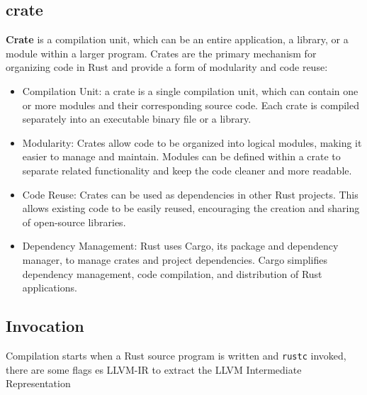 \documentclass{article}
\begin{document}
\subsection{crate}
\textbf{Crate} is a compilation unit, which can be an entire application, a library, or a module within a larger program. Crates are the primary mechanism for organizing code in Rust and provide a form of modularity and code reuse:
\begin{itemize}
    \item Compilation Unit: a crate is a single compilation unit, which can contain one or more modules and their corresponding source code. Each crate is compiled separately into an executable binary file or a library.
    \item Modularity: Crates allow code to be organized into logical modules, making it easier to manage and maintain. Modules can be defined within a crate to separate related functionality and keep the code cleaner and more readable.
    \item Code Reuse: Crates can be used as dependencies in other Rust projects. This allows existing code to be easily reused, encouraging the creation and sharing of open-source libraries.
    \item Dependency Management: Rust uses Cargo, its package and dependency manager, to manage crates and project dependencies. Cargo simplifies dependency management, code compilation, and distribution of Rust applications.
\end{itemize}

\subsection{Invocation}
Compilation starts when a Rust source program is written and \texttt{rustc} invoked, there are some flags es LLVM-IR to extract the LLVM Intermediate Representation  
\end{document}
